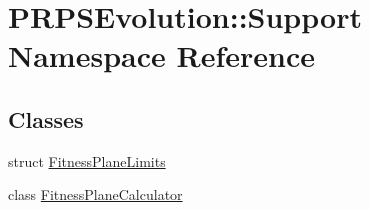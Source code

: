 \hypertarget{namespace_p_r_p_s_evolution_1_1_support}{\section{\-P\-R\-P\-S\-Evolution\-:\-:\-Support \-Namespace \-Reference}
\label{namespace_p_r_p_s_evolution_1_1_support}
}
\subsection*{\-Classes}
\begin{DoxyCompactItemize}
\item 
struct \hyperlink{struct_p_r_p_s_evolution_1_1_support_1_1_fitness_plane_limits}{\-Fitness\-Plane\-Limits}
\item 
class \hyperlink{class_p_r_p_s_evolution_1_1_support_1_1_fitness_plane_calculator}{\-Fitness\-Plane\-Calculator}
\end{DoxyCompactItemize}
